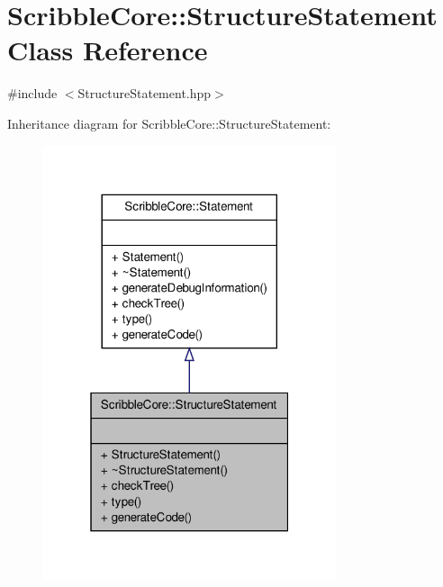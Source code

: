 \hypertarget{class_scribble_core_1_1_structure_statement}{\section{Scribble\-Core\-:\-:Structure\-Statement Class Reference}
\label{class_scribble_core_1_1_structure_statement}
}


{\ttfamily \#include $<$Structure\-Statement.\-hpp$>$}



Inheritance diagram for Scribble\-Core\-:\-:Structure\-Statement\-:
\nopagebreak
\begin{figure}[H]
\begin{center}
\leavevmode
\includegraphics[width=244pt]{class_scribble_core_1_1_structure_statement__inherit__graph}
\end{center}
\end{figure}



